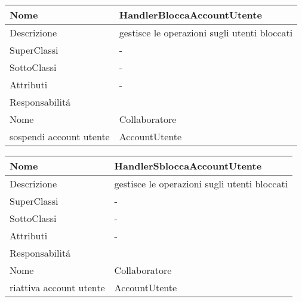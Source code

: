 \begin{center} %
    \begin{longtable}{ |p{3cm}|p{3cm}|p{3cm}|p{3cm}| }
        \hline
        Nome & \multicolumn{3}{|p{9cm}|}{HandlerBloccaAccountUtente} \\\hline
        Descrizione & \multicolumn{3}{|p{9cm}|}{gestisce le operazioni sugli utenti bloccati} \\\hline
        SuperClassi & \multicolumn{3}{|p{9cm}|}{-} \\\hline
        SottoClassi & \multicolumn{3}{|p{9cm}|}{-} \\\hline
        Attributi & \multicolumn{3}{|p{9cm}|}{-} \\\hline
        \multicolumn{4}{|p{12cm}|}{Responsabilit\'a} \\\hline %
        \multicolumn{2}{|p{6cm}|}{Nome} & \multicolumn{2}{|p{6cm}|}{Collaboratore} \\\hline %
        \multicolumn{2}{|p{6cm}|}{sospendi account utente} & \multicolumn{2}{|p{6cm}|}{AccountUtente} \\\hline
    \end{longtable}
\end{center}

\begin{center} %
    \begin{longtable}{ |p{3cm}|p{3cm}|p{3cm}|p{3cm}| }
        \hline
        Nome & \multicolumn{3}{|p{9cm}|}{HandlerSbloccaAccountUtente} \\\hline
        Descrizione & \multicolumn{3}{|p{9cm}|}{gestisce le operazioni sugli utenti bloccati} \\\hline
        SuperClassi & \multicolumn{3}{|p{9cm}|}{-} \\\hline
        SottoClassi & \multicolumn{3}{|p{9cm}|}{-} \\\hline
        Attributi & \multicolumn{3}{|p{9cm}|}{-} \\\hline
        \multicolumn{4}{|p{12cm}|}{Responsabilit\'a} \\\hline %
        \multicolumn{2}{|p{6cm}|}{Nome} & \multicolumn{2}{|p{6cm}|}{Collaboratore} \\\hline %
        \multicolumn{2}{|p{6cm}|}{riattiva account utente} & \multicolumn{2}{|p{6cm}|}{AccountUtente} \\\hline
    \end{longtable}
\end{center}

